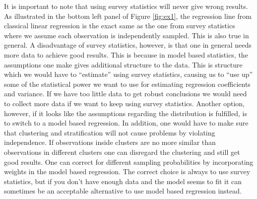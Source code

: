\documentclass{article}
\begin{document}
%
%
%
%
%

It is important to note that using survey statistics will never give wrong
results. As illustrated in the bottom left panel of Figure \ref{fig:ex1}, the
regression line from classical linear regression is the exact same as the one
from survey statistics where we assume each observation is independently sampled.
This is also true in general. A disadvantage of survey statistics, however, is
that one in general needs more data to achieve good results. This is because in
model based statistics, the assumptions one make gives additional structure to
the data. This is structure which we would have to ``estimate'' using survey
statistics, causing us to ``use up'' some of the statistical power we want to
use for estimating regression coefficients and variance. If we have too little
data to get robust conclusions we would need to collect more data if we want
to keep using survey statistics. Another option, however, if it looks like the
assumptions regarding the distribution is  fulfilled, is to switch to
a model based regression. In addition, one would have to make sure that
clustering and stratification will not cause problems by violating independence.
If observations inside clusters are no more similar than observations in
different clusters one can disregard the clustering and still get good results.
One can correct for different sampling probabilities by incorporating weights in
the model based regression.
The correct choice is always to use survey statistics, but if you don't have
enough data and the model seems to fit it can sometimes be an acceptable
alternative to use model based regression instead.
\end{document}
